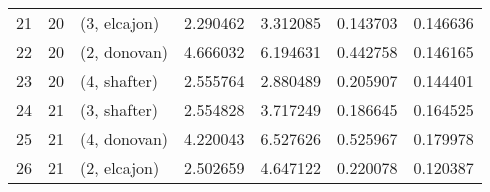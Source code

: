 \begin{tabular}{lllrrrr}
21 &    20 &  (3, elcajon) &  2.290462 &  3.312085 &   0.143703 &  0.146636 \\
22 &    20 &  (2, donovan) &  4.666032 &  6.194631 &   0.442758 &  0.146165 \\
23 &    20 &  (4, shafter) &  2.555764 &  2.880489 &   0.205907 &  0.144401 \\
24 &    21 &  (3, shafter) &  2.554828 &  3.717249 &   0.186645 &  0.164525 \\
25 &    21 &  (4, donovan) &  4.220043 &  6.527626 &   0.525967 &  0.179978 \\
26 &    21 &  (2, elcajon) &  2.502659 &  4.647122 &   0.220078 &  0.120387 \\
\bottomrule
\end{tabular}
